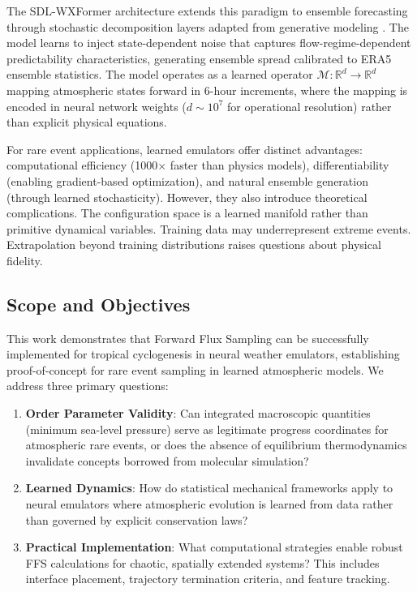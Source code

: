 \documentclass[11pt]{article}
\begin{document}
The SDL-WXFormer architecture \citep{schreck2024sdl} extends this paradigm to ensemble forecasting through stochastic decomposition layers adapted from generative modeling \citep{karras2019stylebased}. The model learns to inject state-dependent noise that captures flow-regime-dependent predictability characteristics, generating ensemble spread calibrated to ERA5 ensemble statistics. The model operates as a learned operator $\mathcal{M}: \mathbb{R}^d \to \mathbb{R}^d$ mapping atmospheric states forward in 6-hour increments, where the mapping is encoded in neural network weights ($d \sim 10^7$ for operational resolution) rather than explicit physical equations.

For rare event applications, learned emulators offer distinct advantages: computational efficiency (1000$\times$ faster than physics models), differentiability (enabling gradient-based optimization), and natural ensemble generation (through learned stochasticity). However, they also introduce theoretical complications. The configuration space is a learned manifold rather than primitive dynamical variables. Training data may underrepresent extreme events. Extrapolation beyond training distributions raises questions about physical fidelity.

\subsection{Scope and Objectives}

This work demonstrates that Forward Flux Sampling can be successfully implemented for tropical cyclogenesis in neural weather emulators, establishing proof-of-concept for rare event sampling in learned atmospheric models. We address three primary questions:

\begin{enumerate}
    \item \textbf{Order Parameter Validity}: Can integrated macroscopic quantities (minimum sea-level pressure) serve as legitimate progress coordinates for atmospheric rare events, or does the absence of equilibrium thermodynamics invalidate concepts borrowed from molecular simulation?
    
    \item \textbf{Learned Dynamics}: How do statistical mechanical frameworks apply to neural emulators where atmospheric evolution is learned from data rather than governed by explicit conservation laws?
    
    \item \textbf{Practical Implementation}: What computational strategies enable robust FFS calculations for chaotic, spatially extended systems? This includes interface placement, trajectory termination criteria, and feature tracking.
\end{enumerate}
\end{document}
